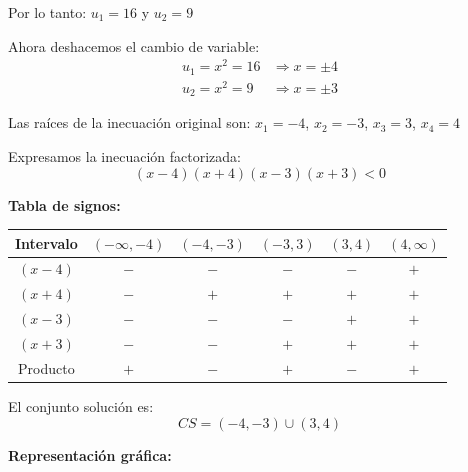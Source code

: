 \documentclass[12pt]{article}
\begin{document}
\begin{enumerate}[label=\alph*.-]
    Por lo tanto: $u_1 = 16$ y $u_2 = 9$

    Ahora deshacemos el cambio de variable:
    \begin{align*}
    u_1 = x^2 = 16 &\Rightarrow x = \pm 4 \\
    u_2 = x^2 = 9 &\Rightarrow x = \pm 3
    \end{align*}

    Las raíces de la inecuación original son: $x_1 = -4$, $x_2 = -3$, $x_3 = 3$, $x_4 = 4$

    Expresamos la inecuación factorizada:
    \[
    (x - 4)(x + 4)(x - 3)(x + 3) < 0
    \]

    \textbf{Tabla de signos:}

    \begin{center}
    \begin{tabular}{|c|c|c|c|c|c|}
    \hline
    Intervalo & $(-\infty,-4)$ & $(-4,-3)$ & $(-3,3)$ & $(3,4)$ & $(4,\infty)$ \\
    \hline
    $(x-4)$ & $-$ & $-$ & $-$ & $-$ & $+$ \\
    \hline
    $(x+4)$ & $-$ & $+$ & $+$ & $+$ & $+$ \\
    \hline
    $(x-3)$ & $-$ & $-$ & $-$ & $+$ & $+$ \\
    \hline
    $(x+3)$ & $-$ & $-$ & $+$ & $+$ & $+$ \\
    \hline
    Producto & $+$ & $-$ & $+$ & $-$ & $+$ \\
    \hline
    \end{tabular}
    \end{center}

    El conjunto solución es:
    \[
    \boxed{CS = (-4, -3) \cup (3, 4)}
    \]

    \newpage
    \textbf{Representación gráfica:}

    \begin{center}
    \end{center}
\end{enumerate}
\end{document}
